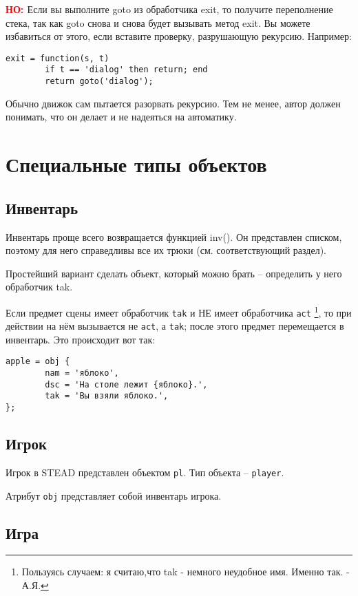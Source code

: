 \documentclass[a4paper,12pt]{article}
\begin{document}
\textbf{\textcolor{red}{НО: }}Если вы выполните goto из обработчика exit, то получите переполнение стека, так как goto снова и снова будет вызывать метод exit. Вы можете избавиться от этого, если вставите проверку, разрушающую рекурсию. Например:

\begin{verbatim}
exit = function(s, t)
        if t == 'dialog' then return; end
        return goto('dialog');
\end{verbatim}

Обычно движок сам пытается разорвать рекурсию. Тем не менее, автор должен понимать, что он делает и не надеяться на автоматику.

\section{Специальные типы объектов}

\subsection{Инвентарь}

Инвентарь проще всего возвращается функцией inv(). Он представлен списком, поэтому для него справедливы все их трюки (см. соответствующий раздел).

Простейший вариант сделать объект, который можно брать -- определить у него обработчик tak.

Если предмет сцены имеет обработчик \verb/tak/ и НЕ имеет обработчика \verb/act/ \footnote{Пользуясь случаем: я считаю,что tak - немного неудобное имя. Именно так. - А.Я.}, то при действии на нём вызывается не \verb/act/, а \verb/tak/; после этого предмет перемещается в инвентарь. Это происходит вот так:

\begin{verbatim}
apple = obj {
        nam = 'яблоко',
        dsc = 'На столе лежит {яблоко}.',
        tak = 'Вы взяли яблоко.',
};
\end{verbatim}

\subsection{Игрок}

Игрок в STEAD представлен объектом \verb/pl/. Тип объекта -- \verb/player/.

Атрибут \verb/obj/ представляет собой инвентарь игрока.

\subsection{Игра}
\end{document}
